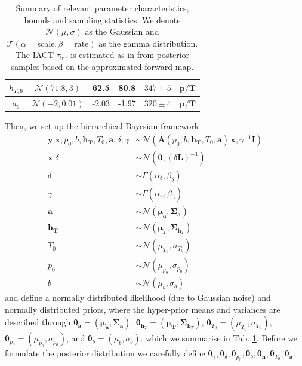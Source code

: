 \begin{table}
\begin{tabular}{ |c||c|c|c|c|c|   }
		$h_{T,6}$ &  $\mathcal{N}(71.8,3)$&62.5 &80.8&$347 \pm 5$&$\bm{p/T}$\\ \hline
		$a_{6}$ & $\mathcal{N}(-2,0.01)$ &-2.03 &-1.97&$320 \pm 4$&$\bm{p/T}$\\
		\hline
	\end{tabular}
	\caption[Summary of relevant parameter characteristics, bounds and sampling statistics.]{Summary of relevant parameter characteristics, bounds and sampling statistics. We denote $\mathcal{N}(\mu,\sigma)$ as the Gaussian and $\mathcal{T}(\alpha = \text{scale}, \beta = \text{rate})$ as the gamma distribution. The IACT $\tau_{\text{int}}$ is estimated as in \cite{UwerrM} from posterior samples based on the approximated forward map.}
	\label{tab:priors}
\end{table}

Then, we set up the hierarchical Bayesian framework
\begin{subequations}
	\begin{align}
		\bm{y} |  \bm{x},p_0,b,\bm{h}_{\bm{T}},T_0,\bm{a},\delta,\gamma  &\sim \mathcal{N}(\bm{A}(p_0,b,\bm{h}_{\bm{T}},T_0,\bm{a}) \, \bm{x}, \gamma^{-1} \bm{I}) \label{eq:likelihoodFull} \\
		\bm{x}| \delta  &\sim \mathcal{N}(\bm{0}, (\delta \bm{L})^{-1} ) \label{eq:priorXFull} \\
		\delta  &\sim \Gamma(\alpha_{\delta} , \beta_{\delta} )\label{eq:priorDelFull} \\
		\gamma  &\sim \Gamma(\alpha_{\gamma}, \beta_{\gamma})\label{eq:priorGamFull} \\
		\bm{a}  &\sim \mathcal{N}(\bm{\mu}_{\bm{a}}, \bm{\Sigma}_{\bm{a}})\\
		\bm{h}_{\bm{T}}  &\sim \mathcal{N}(\bm{\mu}_{T}, \bm{\Sigma}_{\bm{h}_T}) \\
		T_0  &\sim \mathcal{N}(\mu_{T_0}, \sigma_{T_0} )\\
		p_0  &\sim \mathcal{N}(\mu_{p_0}, \sigma_{p_0} )\\
		b  &\sim \mathcal{N}(\mu_b, \sigma_b )
	\end{align}
	\label{eq:BayMode}
\end{subequations}
and define a normally distributed likelihood (due to Gaussian noise) and normally distributed priors, where the hyper-prior means and variances are described through $\bm{\theta}_{\bm{a}} =(\bm{\mu}_{\bm{a}}, \bm{\Sigma}_{\bm{a}})$, $\bm{\theta}_{\bm{h}_T} = (\bm{\mu}_{\bm{T}}, \bm{\Sigma}_{\bm{h}_T}) $, 
$\bm{\theta}_{T_0} = (\mu_{T_0}, \sigma_{T_0})$, $\bm{\theta}_{p_0} = (\mu_{p_0}, \sigma_{p_0})$, and $\bm{\theta}_{b} = (\mu_{b}, \sigma_{b})$.
which we summarise in Tab. \ref{tab:priors}.
Before we formulate the posterior distribution we carefully define $\bm{\theta}_{\gamma}, \bm{\theta}_{\delta},\bm{\theta}_{p_0},\bm{\theta}_{b},\bm{\theta}_{\bm{h}},\bm{\theta}_{T_0},\bm{\theta}_{\bm{a}}$.

